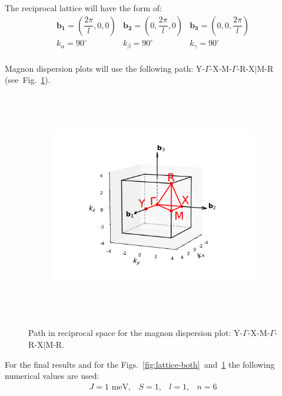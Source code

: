 \documentclass[a4paper,12pt]{article}
\begin{document}
        The reciprocal lattice will have the form of:
        \begin{equation}
            \begin{matrix}
                \mathbf{b_1} = (\dfrac{2\pi}{l}, 0, 0) & \mathbf{b_2} = (0,\dfrac{2\pi}{l}, 0) & \mathbf{b_3} = (0, 0, \dfrac{2\pi}{l}) \\
                k_{\alpha} = 90^{\circ} & k_{\beta} = 90^{\circ} & k_{\gamma} = 90^{\circ} \\
            \end{matrix}
        \end{equation}

        Magnon dispersion plots will use the following path: Y-$\Gamma$-X-M-$\Gamma$-R-X$\vert$M-R (see~Fig.~\ref{fig:path}).

        \begin{figure}[H]
            \centering
            \begin{subfigure}[b]{0.8\textwidth}
                \centering
                \includegraphics[height=10cm]{path.pdf}
            \end{subfigure}
            \hfill
            \caption{Path in reciprocal space for the magnon dispersion plot: Y-$\Gamma$-X-M-$\Gamma$-R-X$\vert$M-R.}
            \label{fig:path}
        \end{figure}


        For the final results and for the Figs.~\ref{fig:lattice-both}~and~\ref{fig:path} the following numerical values are used:
        \begin{equation}
            \begin{matrix}
                J = 1 \text{ meV}, & S = 1, & l = 1, & n = 6
            \end{matrix}
        \end{equation}
\end{document}
